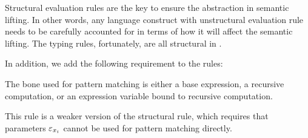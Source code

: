 Structural evaluation rules are the key to ensure the abstraction in semantic lifting.
In other words, any language construct with unstructural evaluation rule needs to be carefully accounted for in terms of how it will affect the semantic lifting.
The typing rules, fortunately, are all structural in \STLC.

\todo{}
In addition, we add the following requirement to the rules:
\begin{requirement}\label{req:pat}
  The bone used for pattern matching is either a base expression, 
   a recursive computation,
   or an expression variable bound to recursive computation.
\end{requirement}
This rule is a weaker version of the structural rule,
 which requires that parameters $\varepsilon_{x_i}$ cannot be used for pattern matching directly.
